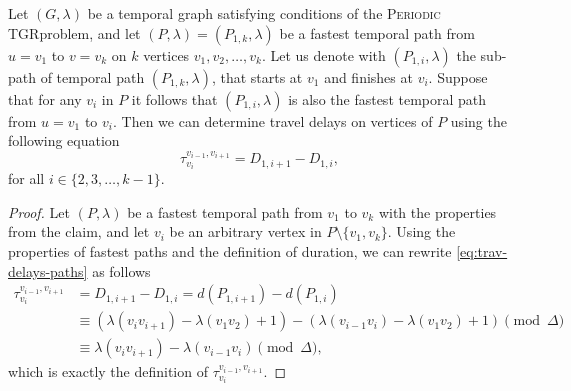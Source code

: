 \documentclass[a4paper,UKenglish,cleveref, autoref, thm-restate]{lipics-v2021}
\newcommand{\deltaExact}{\textsc{Periodic TGR}}
\begin{document}
\begin{lemma} \label{lemma:unique-fastest-path-allDelays}
    Let $(G, \lambda)$ be a temporal graph satisfying conditions of the \deltaExact problem,
    and let $(P,\lambda)=(P_{1,k},\lambda)$ be a fastest temporal path from $u=v_1$ to $v=v_k$ on $k$ vertices $v_1,v_2,\dots,v_k$.
    Let us denote with $(P_{1,i}, \lambda)$ the sub-path of temporal path $(P_{1,k},\lambda)$, that starts at $v_1$ and finishes at $v_i$.
    Suppose that for any $v_i$ in $P$ it follows that $(P_{1,i}, \lambda)$ is also the fastest temporal path from $u=v_1$ to $v_i$.
    Then we can determine travel delays on vertices of $P$ using the following equation
    \begin{equation}\label{eq:trav-delays-paths}
        \tau_{v_i}^{v_{i-1},v_{i+1}} = D_{1,i+1} - D_{1,i},
    \end{equation}
    for all $i \in \{2,3, \dots, k-1\}$.
\end{lemma}

\begin{proof}
    Let $(P,\lambda)$ be a fastest temporal path from $v_1$ to $v_k$ with the properties from the claim, and let $v_i$ be an arbitrary vertex in $P \setminus \{v_1,v_k\}$.
    Using the properties of fastest paths and the definition of duration, we can rewrite \cref{eq:trav-delays-paths} as follows
    \begin{align*}
        \tau_{v_i}^{v_{i-1},v_{i+1}} & = D_{1,i+1} - D_{1,i} =  d(P_{1,i+1}) - d(P_{1,i}) \\
        & \equiv 
        \left(\lambda(v_{i}v_{i+1}) - \lambda(v_1v_2) + 1\right) -  
        \left(\lambda(v_{i-1}v_{i}) - \lambda(v_1v_2) + 1\right) \pmod \Delta \\
        & \equiv \lambda(v_{i}v_{i+1}) - \lambda(v_{i-1}v_{i}) \pmod \Delta,
        \end{align*}
    which is exactly the definition of $\tau_{v_i}^{v_{i-1},v_{i+1}}$.
\end{proof}
\end{document}
